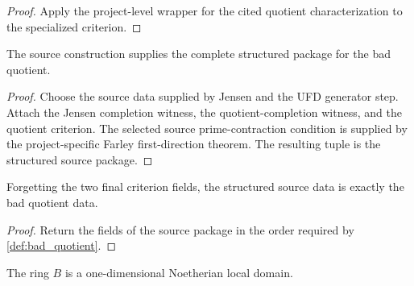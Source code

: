 \begin{proof}
  Apply the project-level wrapper for the cited quotient characterization to
  the specialized criterion.
\end{proof}

\begin{lemma}
  \label{lem:bad_quotient_structured_source}
  The source construction supplies the complete structured package for the bad
  quotient.
\end{lemma}

\begin{proof}
  Choose the source data supplied by Jensen and the UFD generator step.  Attach
  the Jensen completion witness, the quotient-completion witness, and the
  quotient criterion.  The selected source prime-contraction condition is
  supplied by the project-specific Farley first-direction theorem.  The
  resulting tuple is the structured source package.
\end{proof}

\begin{lemma}
  \label{lem:source_data_to_bad_quotient}
  Forgetting the two final criterion fields, the structured source data is
  exactly the bad quotient data.
\end{lemma}

\begin{proof}
  Return the fields of the source package in the order required by
  \cref{def:bad_quotient}.
\end{proof}

\begin{lemma}
  \label{lem:bad_quotient_dimension_domain}
  The ring \(B\) is a one-dimensional Noetherian local domain.
\end{lemma}

